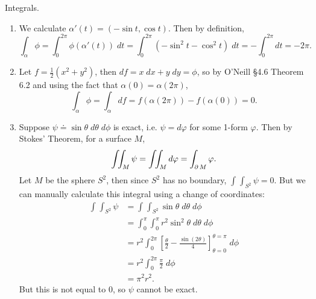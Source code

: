 \documentclass[twoside,10pt]{report}
\begin{document}
\newpage
\begin{exer}[]
Integrals.
\end{exer}
\begin{enumerate}
	\item We calculate $\alpha'(t) = (-\sin t, \cos t)$. Then by definition,
		\[
			\int_{\alpha} \phi= \int_{0}^{2\pi} \phi(\alpha'(t))\;dt = \int_{0}^{2\pi} (-\sin^{2}t-\cos^{2}t)\;dt =-\int_{0}^{2\pi} dt = -2\pi.
		\] 
	\item Let $f=\frac{1}{2} (x^2+y^2)$, then $df = x\;dx + y\;dy=\phi$, so by O'Neill \S 4.6 Theorem 6.2 and using the fact that $\alpha(0) = \alpha(2\pi)$,
		\[
			\int_{\alpha} \phi = \int_{\alpha} df = f(\alpha(2\pi)) - f(\alpha(0)) = 0.
		\] 

	\item Suppose $\psi \doteq \sin\theta\;d\theta\;d\phi$ is exact, i.e. $\psi=d\varphi$ for some 1-form $\varphi$. Then by Stokes' Theorem, for a surface $M$,
		\[
		\int_{} \int_{M} \psi = \int_{} \int_{M} d\varphi = \int_{\operatorname{\partial} M} \varphi.
		\] Let $M$ be the sphere $S^{2}$, then since $S^{2}$ has no boundary, $\int_{} \int_{S^{2}} \psi=0$. But we can manually calculate this integral using a change of coordinates:
		\begin{align*}
			\int_{} \int_{S^{2}} \psi &= \int_{} \int_{S^{2}} \sin\theta\;d\theta\;d\phi \\
						  &= \int_{0}^{\pi} \int_{0}^{\pi} r^{2}\sin^{2}\theta\;d\theta\;d\phi \\
						  &= r^{2}\int_{0}^{2\pi} \left[ \frac{\theta}{2} -\frac{\sin(2\theta)}{4}  \right]^{\theta=\pi}_{\theta=0}\;d\phi \\
						  &= r^{2}\int_{0}^{2\pi} \frac{\pi}{2} \;d\phi\\
						  &= \pi^{2}r^2.
		\end{align*}
		But this is not equal to 0, so $\psi$ cannot be exact.
\end{enumerate}
\end{document}
